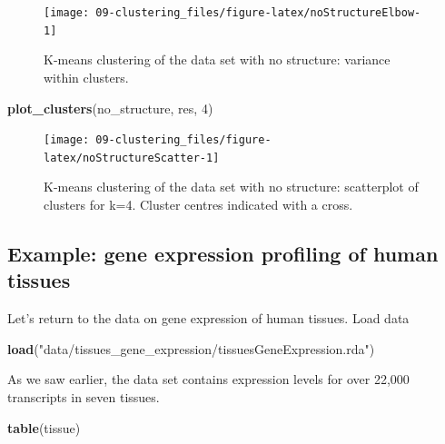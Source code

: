 \documentclass[]{book}
\newenvironment{Shaded}{\begin{snugshade}}{\end{snugshade}}
\newcommand{\KeywordTok}[1]{\textcolor[rgb]{0.13,0.29,0.53}{\textbf{{#1}}}}
\newcommand{\DecValTok}[1]{\textcolor[rgb]{0.00,0.00,0.81}{{#1}}}
\newcommand{\StringTok}[1]{\textcolor[rgb]{0.31,0.60,0.02}{{#1}}}
\newcommand{\NormalTok}[1]{{#1}}
\theoremstyle{definition}
\theoremstyle{definition}
\theoremstyle{definition}
\theoremstyle{remark}
\begin{document}
\begin{figure}

{\centering \texttt{[image: 09-clustering\_files/figure-latex/noStructureElbow-1]} 

}

\caption{K-means clustering of the data set with no structure: variance within clusters.}\label{fig:noStructureElbow}
\end{figure}

\begin{Shaded}
\begin{Highlighting}[]
\KeywordTok{plot_clusters}\NormalTok{(no_structure, res, }\DecValTok{4}\NormalTok{)}
\end{Highlighting}
\end{Shaded}

\begin{figure}

{\centering \texttt{[image: 09-clustering\_files/figure-latex/noStructureScatter-1]} 

}

\caption{K-means clustering of the data set with no structure: scatterplot of clusters for k=4. Cluster centres indicated with a cross.}\label{fig:noStructureScatter}
\end{figure}

\subsection{Example: gene expression profiling of human
tissues}\label{example-gene-expression-profiling-of-human-tissues-1}

Let's return to the data on gene expression of human tissues. Load data

\begin{Shaded}
\begin{Highlighting}[]
\KeywordTok{load}\NormalTok{(}\StringTok{"data/tissues_gene_expression/tissuesGeneExpression.rda"}\NormalTok{)}
\end{Highlighting}
\end{Shaded}

As we saw earlier, the data set contains expression levels for over
22,000 transcripts in seven tissues.

\begin{Shaded}
\begin{Highlighting}[]
\KeywordTok{table}\NormalTok{(tissue)}
\end{Highlighting}
\end{Shaded}
\end{document}
